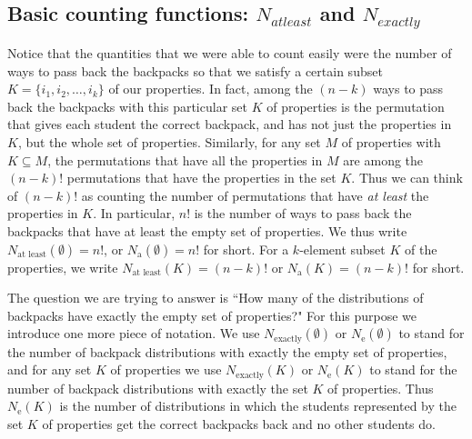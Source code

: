 \documentclass[10pt,]{book}
\theoremstyle{plain}
\theoremstyle{definition}
\numberwithin{equation}{chapter}
\begin{document}
\subsection[{Basic counting functions: \(N_{ at least }\) and \(N_{ exactly }\)}]{Basic counting functions: \(N_{ at least }\) and \(N_{ exactly }\)}\label{subsection-36}
Notice that the quantities that we were able to count easily were the number of ways to pass back the backpacks so that we satisfy a certain subset \(K= \{i_1,i_2,\ldots,i_k\}\) of our properties. In fact, among the \((n-k)\) ways to pass back the backpacks with this particular set \(K\) of properties is the permutation that gives each student the correct backpack, and has not just the properties in \(K\), but the whole set of properties. Similarly, for any set \(M\) of properties with \(K\subseteq
M\), the permutations that have all the properties in \(M\) are among the \((n-k)!\) permutations that have the properties in the set \(K\). Thus we can think of \((n-k)!\) as counting the number of permutations that have \emph{at least} the properties in \(K\). In particular, \(n!\) is the number of ways to pass back the backpacks that have at least the empty set of properties. We thus write \(N_{\mbox{at least} }(\emptyset)=n!\), or \(N_{\mbox{a} }(\emptyset)=n!\) for short. For a \(k\)-element subset \(K\) of the properties, we write \(N_{\mbox{at least} }(K) =(n-k)!\) or \(N_{\mbox{a} }(K) =(n-k)!\) for short.%
\par
The question we are trying to answer is ``How many of the distributions of backpacks have exactly the empty set of properties?" For this purpose we introduce one more piece of notation. We use \(N_{\mbox{exactly} }(\emptyset)\) or \(N_{\mbox{e} }(\emptyset)\) to stand for the number of backpack distributions with exactly the empty set of properties, and for any set \(K\) of properties we use \(N_{\mbox{exactly} }(K)\) or \(N_{\mbox{e} }(K)\) to stand for the number of backpack distributions with exactly the set \(K\) of properties. Thus \(N_{\mbox{e} }(K)\) is the number of distributions in which the students represented by the set \(K\) of properties get the correct backpacks back and no other students do.%
\typeout{************************************************}
\typeout{************************************************}
\end{document}
